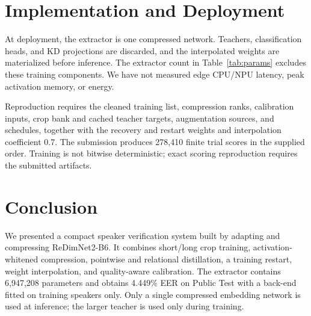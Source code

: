 \documentclass[11pt]{article}
\begin{document}
\section{Implementation and Deployment}
At deployment, the extractor is one compressed network. Teachers, classification heads, and KD projections are discarded, and the interpolated weights are materialized before inference. The extractor count in Table~\ref{tab:params} excludes these training components. We have not measured edge CPU/NPU latency, peak activation memory, or energy.

Reproduction requires the cleaned training list, compression ranks, calibration inputs, crop bank and cached teacher targets, augmentation sources, and schedules, together with the recovery and restart weights and interpolation coefficient 0.7. The submission produces 278,410 finite trial scores in the supplied order. Training is not bitwise deterministic; exact scoring reproduction requires the submitted artifacts.

\section{Conclusion}
We presented a compact speaker verification system built by adapting and compressing ReDimNet2-B6. It combines short/long crop training, activation-whitened compression, pointwise and relational distillation, a training restart, weight interpolation, and quality-aware calibration. The extractor contains 6,947,208 parameters and obtains 4.449\% EER on Public Test with a back-end fitted on training speakers only. Only a single compressed embedding network is used at inference; the larger teacher is used only during training.



\end{document}
